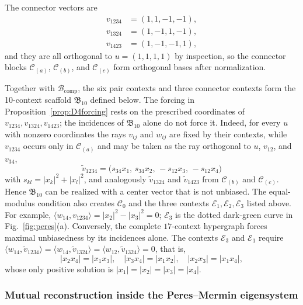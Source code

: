 \documentclass[%
  reprint,
  superscriptaddress,
  showkeys,
  amsmath,amssymb,
  aps,pra,
  longbibliography,
  floatfix,
  x11names
]{revtex4-2}
\begin{document}
The connector vectors are
\begin{align*}
v_{1234}&=(1,1,-1,-1),\\
v_{1324}& =(1,-1,1,-1),\\
v_{1423}&=(1,-1,-1,1),
\end{align*}
and they are all orthogonal to $u=(1,1,1,1)$ by inspection, so the connector blocks $\mathcal{C}_{(a)}$, $\mathcal{C}_{(b)}$, and $\mathcal{C}_{(c)}$ form orthogonal bases after normalization.

Together with $\mathcal{B}_{\mathrm{comp}}$, the six pair contexts and three connector contexts form the 10-context scaffold $\mathfrak{B}_{10}$ defined below.  The forcing in Proposition~\ref{prop:D4forcing} rests on the prescribed coordinates of $v_{1234},v_{1324},v_{1423}$; the incidences of $\mathfrak{B}_{10}$ alone do not force it.  Indeed, for every $u$ with nonzero coordinates the rays $v_{ij}$ and $w_{ij}$ are fixed by their contexts, while $v_{1234}$ occurs only in $\mathcal{C}_{(a)}$ and may be taken as the ray orthogonal to $u$, $v_{12}$, and $v_{34}$,
\[
\tilde v_{1234}=\bigl(s_{34}x_1,\,s_{34}x_2,\,-s_{12}x_3,\,-s_{12}x_4\bigr)
\]
with $s_{kl}=|x_k|^2+|x_l|^2$, and analogously $\tilde v_{1324}$ and $\tilde v_{1423}$ from $\mathcal{C}_{(b)}$ and $\mathcal{C}_{(c)}$.  Hence $\mathfrak{B}_{10}$ can be realized with a center vector that is not unbiased.  The equal-modulus condition also creates $\mathcal{C}_0$ and the three contexts $\mathcal{E}_1,\mathcal{E}_2,\mathcal{E}_3$ listed above.  For example, $\langle w_{14},v_{1234}\rangle=|x_2|^2-|x_3|^2=0$; $\mathcal{E}_3$ is the dotted dark-green curve in Fig.~\ref{fig:peres}(a).  Conversely, the complete $17$-context hypergraph forces maximal unbiasedness by its incidences alone.  The contexts $\mathcal{E}_3$ and $\mathcal{E}_1$ require $\langle w_{14},\tilde v_{1234}\rangle=\langle w_{14},\tilde v_{1324}\rangle=\langle w_{12},\tilde v_{1324}\rangle=0$, that is,
\[
|x_2x_4|=|x_1x_3|,\quad
|x_3x_4|=|x_1x_2|,\quad
|x_2x_3|=|x_1x_4|,
\]
whose only positive solution is $|x_1|=|x_2|=|x_3|=|x_4|$.


\subsubsection{Mutual reconstruction inside the Peres--Mermin eigensystem}
\end{document}
